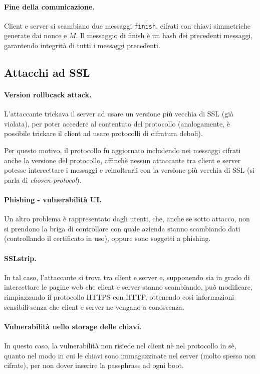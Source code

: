 \documentclass[a4paper, 10pt, twoside]{article}
\begin{document}
	\paragraph{Fine della comunicazione.} Client e server si scambiano due messaggi \lstinline{finish}, cifrati con chiavi simmetriche generate dai nonce e $M$. Il messaggio di finish è un hash dei precedenti messaggi, garantendo integrità di tutti i messaggi precedenti.

	\subsection{Attacchi ad SSL}
	\paragraph{Version rollbcack attack.} L'attaccante trickava il server ad usare un versione più vecchia di SSL (già violata), per poter accedere al contentuto del protocollo (analogamente, è possibile trickare il client ad usare protocolli di cifratura deboli).

	Per questo motivo, il protocollo fu aggiornato includendo nei messaggi cifrati anche la versione del protocollo, affinchè nessun attaccante tra client e server potesse intercettare i messaggi e reinoltrarli con la versione più vecchia di SSL (si parla di \textit{chosen-protocol}).

	\paragraph{Phishing - vulnerabilità UI.} Un altro problema è rappresentato dagli utenti, che, anche se sotto attacco, non si prendono la briga di controllare con quale azienda stanno scambiando dati (controllando il certificato in uso), oppure sono soggetti a phishing.

	\paragraph{SSLstrip.} In tal caso, l'attaccante si trova tra client e server e, supponendo sia in grado di intercettare le pagine web che client e server stanno scambiando, può modificare, rimpiazzando il protocollo HTTPS con HTTP, ottenendo così informazioni sensibili senza che client e server ne vengano a conoscenza.

	\paragraph{Vulnerabilità nello storage delle chiavi.} In questo caso, la vulnerabilità non risiede nel client nè nel protocollo in sè, quanto nel modo in cui le chiavi sono immagazzinate nel server (molto spesso non cifrate), per non dover inserire la passphrase ad ogni boot.
\end{document}
